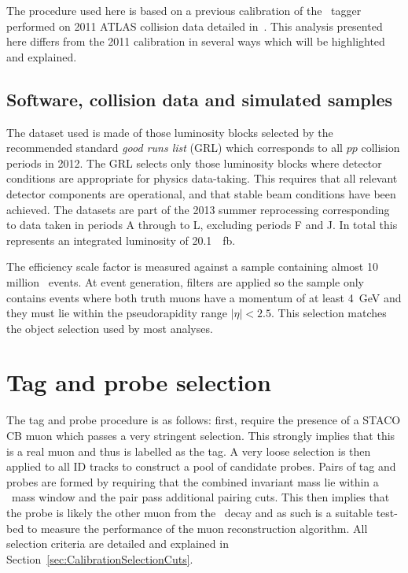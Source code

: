 The procedure used here is based on a previous calibration of the \xsm\ tagger performed on 2011 ATLAS collision data detailed in~\cite{Calibration:MattThesis}. This analysis presented here differs from the 2011 calibration in several ways which will be highlighted and explained.

\subsection*{Software, collision data and simulated samples}

The dataset used is made of those luminosity blocks selected by the recommended standard \emph{good runs list} (GRL) which corresponds to all $pp$ collision periods in 2012. The GRL selects only those luminosity blocks where detector conditions are appropriate for physics data-taking. This requires that all relevant detector components are operational, and that stable beam conditions have been achieved. The datasets are part of the 2013 summer reprocessing corresponding to data taken in periods A through to L, excluding periods F and J. In total this represents an integrated luminosity of \SI{20.1}{\per\femto\barn}. 

The efficiency scale factor is measured against a sample containing almost 10 million \JMu\ events. At event generation, filters are applied so the sample only contains events where both truth muons have a momentum of at least \SI{4}{\GeV} and they must lie within the pseudorapidity range $|\eta|<2.5$. This selection matches the object selection used by most analyses. 

\section{Tag and probe selection}\label{sec:CalibrationSelection}

The tag and probe procedure is as follows: first, require the presence of a STACO CB muon which passes a very stringent selection. This strongly implies that this is a real muon and thus is labelled as the tag. A very loose selection is then applied to all ID tracks to construct a pool of candidate probes. Pairs of tag and probes are formed by requiring that the combined invariant mass lie within a \jpsi\ mass window and the pair pass additional pairing cuts. This then implies that the probe is likely the other muon from the \jpsi\ decay and as such is a suitable test-bed to measure the performance of the muon reconstruction algorithm. All selection criteria are detailed and explained in Section~\ref{sec:CalibrationSelectionCuts}.

